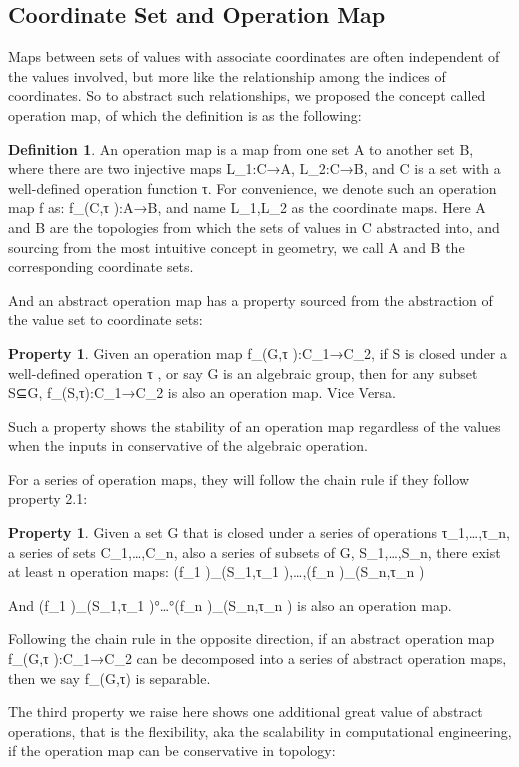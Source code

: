 \documentclass{amsart}
\theoremstyle{definition}
\newtheorem{definition}[theorem]{Definition}
\newtheorem{Property}[theorem]{Property}
\theoremstyle{remark}
\numberwithin{equation}{section}
\begin{document}
		\subsection{Coordinate Set and Operation Map}
			Maps between sets of values with associate coordinates are often independent of the values involved, but more like the relationship among the indices of coordinates. So to abstract such relationships, we proposed the concept called operation map, of which the definition is as the following:
			\begin{definition}
				An operation map is a map from one set A to another set B, where there are two injective maps L_1:C→A, L_2:C→B, and C is a set with a well-defined operation function τ.
				For convenience, we denote such an operation map f as: f_(C,τ ):A→B, and name L_1,L_2 as the coordinate maps. Here A and B are the topologies from which the sets of values in C abstracted into, and sourcing from the most intuitive concept in geometry, we call A and B the corresponding coordinate sets.
				
				And an abstract operation map has a property sourced from the abstraction of the value set to coordinate sets:
			\end{definition}
			
			\begin{Property}
				Given an operation map f_(G,τ ):C_1→C_2, if S is closed under a well-defined operation τ , or say G is an algebraic group, then for any subset S⊆G, f_(S,τ):C_1→C_2 is also an operation map. Vice Versa.
				
				Such a property shows the stability of an operation map regardless of the values when the inputs in conservative of the algebraic operation. 
				
				For a series of operation maps, they will follow the chain rule if they follow property 2.1:
				
			\end{Property}
			
			\begin{Property}
			Given a set G that is closed under a series of operations τ_1,…,τ_n, a series of sets C_1,…,C_n, also a series of subsets of G, S_1,…,S_n, there exist at least n operation maps:
			(f_1 )_(S_1,τ_1 ),…,(f_n )_(S_n,τ_n )
			
			And (f_1 )_(S_1,τ_1 )°…°(f_n )_(S_n,τ_n )   is also an operation map.
			
			Following the chain rule in the opposite direction, if an abstract operation map f_(G,τ ):C_1→C_2 can be decomposed into a series of abstract operation maps, then we say f_(G,τ) is separable.
			
			The third property we raise here shows one additional great value of abstract operations, that is the flexibility, aka the scalability in computational engineering, if the operation map can be conservative in topology:
			
			\end{Property}
			
\end{document}
